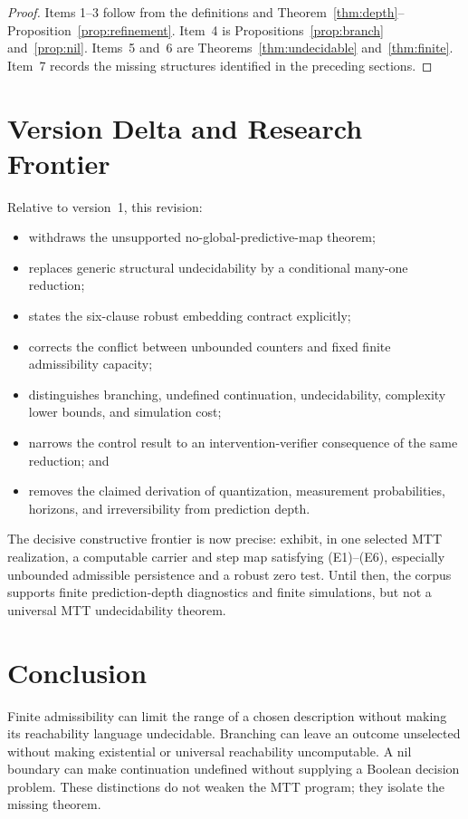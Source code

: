 \documentclass[11pt]{article}
\begin{document}
\begin{proof}
Items 1--3 follow from the definitions and
Theorem~\ref{thm:depth}--Proposition~\ref{prop:refinement}.  Item~4 is
Propositions~\ref{prop:branch} and~\ref{prop:nil}.  Items~5 and~6 are
Theorems~\ref{thm:undecidable} and~\ref{thm:finite}.  Item~7 records the
missing structures identified in the preceding sections.
\end{proof}

\section{Version Delta and Research Frontier}

Relative to version~1, this revision:
\begin{itemize}
\item withdraws the unsupported no-global-predictive-map theorem;
\item replaces generic structural undecidability by a conditional many-one
reduction;
\item states the six-clause robust embedding contract explicitly;
\item corrects the conflict between unbounded counters and fixed finite
admissibility capacity;
\item distinguishes branching, undefined continuation, undecidability,
complexity lower bounds, and simulation cost;
\item narrows the control result to an intervention-verifier consequence of
the same reduction; and
\item removes the claimed derivation of quantization, measurement
probabilities, horizons, and irreversibility from prediction depth.
\end{itemize}

The decisive constructive frontier is now precise: exhibit, in one selected
MTT realization, a computable carrier and step map satisfying
(E1)--(E6), especially unbounded admissible persistence and a robust zero
test.  Until then, the corpus supports finite prediction-depth diagnostics
and finite simulations, but not a universal MTT undecidability theorem.

\section{Conclusion}

Finite admissibility can limit the range of a chosen description without
making its reachability language undecidable.  Branching can leave an outcome
unselected without making existential or universal reachability
uncomputable.  A nil boundary can make continuation undefined without
supplying a Boolean decision problem.  These distinctions do not weaken the
MTT program; they isolate the missing theorem.
\end{document}
